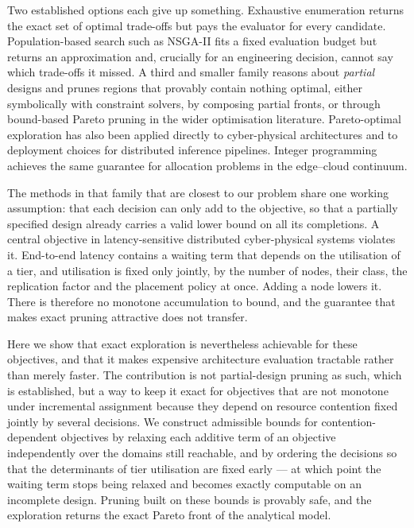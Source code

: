 Two established options each give up something. Exhaustive enumeration returns the exact
set of optimal trade-offs but pays the evaluator for every candidate. Population-based
search such as NSGA-II\cite{deb2002nsga2} fits a fixed evaluation budget but returns an
approximation and, crucially for an engineering decision, cannot say which trade-offs it
missed. A third and smaller family reasons about \emph{partial} designs and prunes
regions that provably contain nothing optimal, either symbolically with constraint
solvers\cite{neubauer2018exact,haubelt2018asp,lukasiewycz2008symbolic,
neubauer2020consistent}, by composing partial fronts\cite{haubelt2003pareto}, or through
bound-based Pareto pruning in the wider optimisation
literature\cite{paretopruning2022,stewart1991moa,mandow2010namoa}. Pareto-optimal
exploration has also been applied directly to cyber-physical architectures
\cite{amir2020pareto,xiao2024contrarc} and to deployment choices for distributed
inference pipelines\cite{guo2023}. Integer programming achieves the same
guarantee for allocation problems in the edge--cloud
continuum\cite{kouloumpris2024optimization,kouloumpris2026reliability}.

The methods in that family that are closest to our problem share one working
assumption: that each decision can only add to the objective, so that a partially
specified design already carries a valid lower bound on all its completions. A central objective in latency-sensitive distributed
cyber-physical systems violates it. End-to-end latency contains a waiting term that depends on the
utilisation of a tier, and utilisation is fixed only jointly, by the number of nodes,
their class, the replication factor and the placement policy at once. Adding a node
lowers it. There is therefore no monotone accumulation to bound, and the guarantee that
makes exact pruning attractive does not transfer.

Here we show that exact exploration is nevertheless achievable for these objectives, and
that it makes expensive architecture evaluation tractable rather than merely faster. The
contribution is not partial-design pruning as such, which is established, but a way to
keep it exact for objectives that are not monotone under incremental assignment because
they depend on resource contention fixed jointly by several decisions. We
construct admissible bounds for contention-dependent objectives by relaxing each additive
term of an objective independently over the domains still reachable, and by ordering the
decisions so that the determinants of tier utilisation are fixed early --- at which point
the waiting term stops being relaxed and becomes exactly computable on an incomplete
design. Pruning built on these bounds is provably safe, and the exploration returns the
exact Pareto front of the analytical model.


